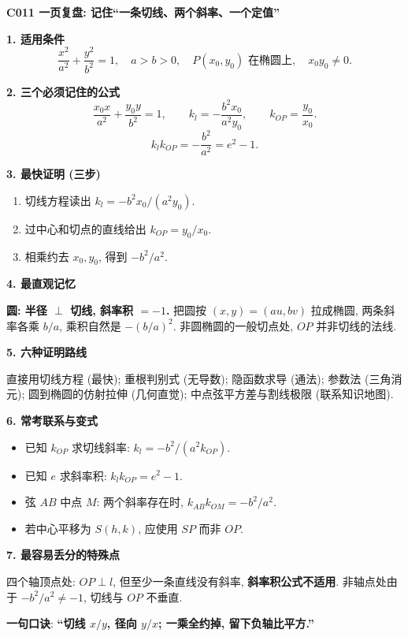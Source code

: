\begin{summarybox}
\textbf{C011 一页复盘: 记住“一条切线、两个斜率、一个定值”}

\textbf{1. 适用条件}
\[
\frac{x^2}{a^2}+\frac{y^2}{b^2}=1,\quad a>b>0,\quad
P(x_0,y_0)\text{ 在椭圆上},\quad x_0y_0\ne0.
\]

\textbf{2. 三个必须记住的公式}
\[
\frac{x_0x}{a^2}+\frac{y_0y}{b^2}=1,
\qquad k_l=-\frac{b^2x_0}{a^2y_0},
\qquad k_{OP}=\frac{y_0}{x_0}.
\]
\[
\boxed{k_lk_{OP}=-\frac{b^2}{a^2}=e^2-1.}
\]

\textbf{3. 最快证明 (三步)}
\begin{enumerate}
  \item 切线方程读出 $k_l=-b^2x_0/(a^2y_0)$.
  \item 过中心和切点的直线给出 $k_{OP}=y_0/x_0$.
  \item 相乘约去 $x_0,y_0$, 得到 $-b^2/a^2$.
\end{enumerate}

\textbf{4. 最直观记忆}

\textbf{圆: 半径 $\perp$ 切线, 斜率积 $=-1$.}
把圆按 $(x,y)=(au,bv)$ 拉成椭圆,
两条斜率各乘 $b/a$, 乘积自然是 $-(b/a)^2$.
非圆椭圆的一般切点处, $OP$ 并非切线的法线.

\textbf{5. 六种证明路线}

直接用切线方程 (最快); 重根判别式 (无导数);
隐函数求导 (通法); 参数法 (三角消元);
圆到椭圆的仿射拉伸 (几何直觉);
中点弦平方差与割线极限 (联系知识地图).

\textbf{6. 常考联系与变式}
\begin{itemize}
  \item 已知 $k_{OP}$ 求切线斜率: $k_l=-b^2/(a^2k_{OP})$.
  \item 已知 $e$ 求斜率积: $k_lk_{OP}=e^2-1$.
  \item 弦 $AB$ 中点 $M$: 两个斜率存在时,
  $k_{AB}k_{OM}=-b^2/a^2$.
  \item 若中心平移为 $S(h,k)$, 应使用 $SP$ 而非 $OP$.
\end{itemize}

\textbf{7. 最容易丢分的特殊点}

四个轴顶点处: $OP\perp l$, 但至少一条直线没有斜率,
\textbf{斜率积公式不适用}.
非轴点处由于 $-b^2/a^2\ne-1$, 切线与 $OP$ 不垂直.

\textbf{一句口诀}: \textbf{“切线 $x/y$, 径向 $y/x$; 一乘全约掉, 留下负轴比平方.”}
\end{summarybox}
